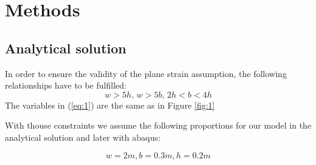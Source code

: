 \documentclass[12pt]{article}
\begin{document}
\section{Methods}

\subsection{Analytical solution}
In order to ensure the validity of the plane strain assumption, the following relationships have to
be fulfilled:
\begin{equation}\label{eq:1}
  w > 5h, \, w > 5b,\, 2h < b < 4h
\end{equation}
The variables in (\ref{eq:1}) are the same as in Figure \ref{fig:1}

With thouse constraints we assume the following proportions for our model in the analytical solution and later with abaqus:

\begin{equation}\label{eq:2}
  w = 2m, b = 0.3m, h = 0.2m
\end{equation}
\end{document}
